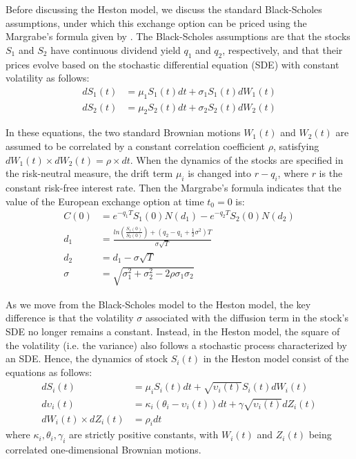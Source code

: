 \documentclass{article}
\begin{document}
    Before discussing the Heston model, we discuss the standard Black-Scholes assumptions, under which this exchange option can be priced using the Margrabe's formula given by \cite{margrabe78}. The Black-Scholes assumptions are that the stocks $S_1$ and $S_2$ have continuous dividend yield $q_1$ and $q_2$, respectively, and that their prices evolve based on the stochastic differential equation (SDE) with constant volatility as follows:
	\begin{align*}
	dS_1(t) &= \mu_1 S_1(t) dt + \sigma_1 S_1(t) dW_1(t) \\
	dS_2(t) &= \mu_2 S_2(t) dt + \sigma_2 S_2(t) dW_2(t)
	\end{align*}	
	
	In these equations, the two standard Brownian motions $W_1(t)$ and $W_2(t)$ are assumed to be correlated by a constant correlation coefficient $\rho$, satisfying $dW_1(t) \times dW_2(t) = \rho \times dt$. When the dynamics of the stocks are specified in the risk-neutral measure, the drift term $\mu_i$ is changed into $r-q_i$, where $r$ is the constant risk-free interest rate. Then the Margrabe's formula indicates that the value of the European exchange option at time $t_0=0$ is:
	\begin{align*}
	C(0) &= e^{-q_1 T} S_1(0) N(d_1) - e^{-q_2 T} S_2(0) N(d_2) \\
	d_1 &= \frac{ln(\frac{S_1(0)}{S_2(0)}) + (q_2 - q_1 + \frac{1}{2} \sigma^2) T}{\sigma \sqrt{T}} \\
	d_2 &= d_1 - \sigma \sqrt{T} \\
	\sigma &= \sqrt{\sigma_1^2 + \sigma_2^2 - 2 \rho \sigma_1 \sigma_2}
	\end{align*}	
	
	As we move from the Black-Scholes model to the Heston model, the key difference is that the volatility $\sigma$ associated with the diffusion term in the stock's SDE no longer remains a constant. Instead, in the Heston model, the square of the volatility (i.e. the variance) also follows a stochastic process characterized by an SDE. Hence, the dynamics of stock $S_i(t)$ in the Heston model consist of the equations as follows:
	\begin{align*}
	dS_i(t) &= \mu_i S_i(t) dt + \sqrt{\upsilon_i(t)} S_i(t) dW_i(t) \\
	d\upsilon_i(t) &= \kappa_i (\theta_i - \upsilon_i(t)) dt + \gamma \sqrt{\upsilon_i(t)} dZ_i(t) \\
	dW_i(t) \times dZ_i(t) &= \rho_i dt
	\end{align*}
	where $\kappa_i, \theta_i, \gamma_i$ are strictly positive constants, with $W_i(t)$ and $Z_i(t)$ being correlated one-dimensional Brownian motions.
    
\end{document}
